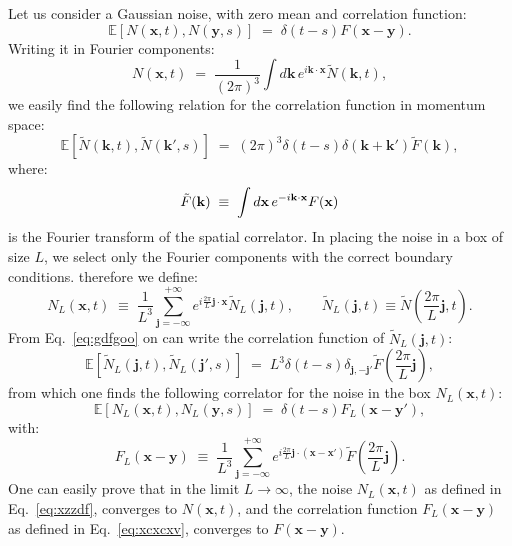 \documentclass[12pt,onecolumn,amssymb,nofootinbib]{revtex4-2} %
\begin{document}
Let us consider a Gaussian noise, with zero mean and correlation function:
\begin{equation}
{\mathbb E}[N(\mathbf{x},t), N(\mathbf{y},s)] \; = \; \delta(t-s)
F(\mathbf{x-y}).
\end{equation}
Writing it in Fourier components:
\begin{equation}
N(\mathbf{x},t) \; = \; \frac{1}{(2\pi)^{3}}\int
d\mathbf{k}\, e^{i\mathbf{k\cdot x}}\tilde{N}(\mathbf{k},t),
\end{equation}
we easily find the following relation for the correlation function in momentum
space:
\begin{equation} \label{eq:gdfgoo}
{\mathbb E}[\tilde{N}(\mathbf{k},t), \tilde{N}(\mathbf{k'},s)] \; = \;
(2\pi)^{3} \delta(t-s) \delta(\mathbf{k+k'}) \tilde{F}(\mathbf{k}),
\end{equation}
where:
\begin{equation}
\tilde{F}(\mathbf{k}) \; \equiv \; \int d{\bf x}\, e^{-i {\bf k \cdot x}} F({\bf x})
\end{equation}
is the Fourier transform of the spatial correlator. In placing the noise in a
box of size $L$, we select only the Fourier components with the correct
boundary conditions. therefore we define:
\begin{equation} \label{eq:xzzdf}
N_{L}(\mathbf{x},t) \; \equiv \; \frac{1}{L^{3}}\sum_{\mathbf{j}=-\infty}^{+\infty}e^{i\frac
{2\pi}{L}\mathbf{j\cdot
x}}\tilde{N}_{L}\left(\mathbf{j},t\right), \qquad
\tilde{N}_{L}\left(\mathbf{j},t\right)\equiv\tilde{N}\left(\frac{2\pi}{L}\mathbf{j},t\right).
\end{equation}
From Eq.~\eqref{eq:gdfgoo} on can write the correlation function of
$\tilde{N}_{L}\left(\mathbf{j},t\right)$:
\begin{equation}
{\mathbb E}[\tilde{N}_{L}(\mathbf{j},t),
\tilde{N}_{L}(\mathbf{j'},s)] \; = \;
L^{3}\delta(t-s)\delta_{\mathbf{j,-j'}}\tilde{F}(\frac{2\pi}{L}\mathbf{j}),
\end{equation}
from which one finds the following correlator for the noise in the box
$N_{L}(\mathbf{x},t)$:
\begin{equation}
{\mathbb E}[N_{L}(\mathbf{x},t), N_{L}(\mathbf{y},s)]
\; = \; \delta(t-s) F_{L}(\mathbf{x-y'}),
\end{equation}
with:
\begin{equation} \label{eq:xcxcxv}
F_{L}(\mathbf{x-y}) \; \equiv \;
\frac{1}{L^{3}}\sum_{\mathbf{j}=-\infty}^{+\infty}e^{i\frac{2\pi}{L}\mathbf{j\cdot
(x-x')}}\tilde{F}(\frac{2\pi}{L}\mathbf{j}).
\end{equation}
One can easily prove that in the limit $L \rightarrow \infty$, the noise
$N_{L}(\mathbf{x},t)$ as defined in Eq.~\eqref{eq:xzzdf}, converges to
$N(\mathbf{x},t)$, and the correlation function $F_{L}(\mathbf{x-y})$ as
defined in Eq.~\eqref{eq:xcxcxv}, converges to $F(\mathbf{x-y})$.
\end{document}

